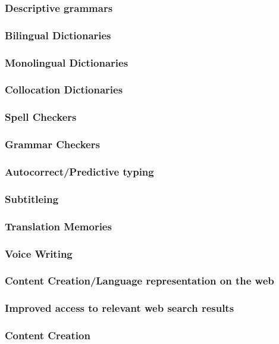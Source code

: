 \documentclass[11pt]{article}
\begin{document}
\subsubsection{Descriptive grammars}
\subsubsection{Bilingual Dictionaries }
\subsubsection{Monolingual Dictionaries}
\subsubsection{Collocation Dictionaries}
\subsubsection{Spell Checkers}
\subsubsection{Grammar Checkers}
\subsubsection{Autocorrect/Predictive typing}
\subsubsection{Subtitleing}
\subsubsection{Translation Memories}
\subsubsection{Voice Writing}
\subsubsection{Content Creation/Language representation on the web}
\subsubsection{Improved access to relevant web search results}
\subsubsection{Content Creation}
\end{document}
